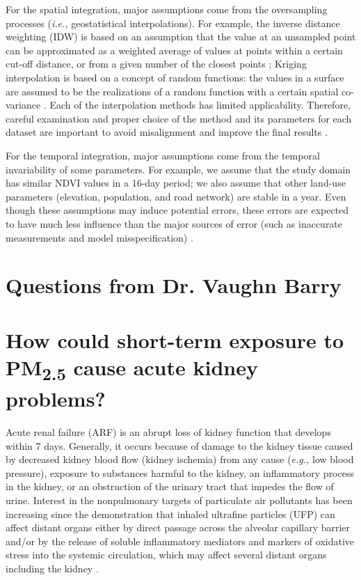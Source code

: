 \documentclass[11pt]{article}
\newcommand{\tsub}{\textsubscript}
\begin{document}
\begin{enumerate*}[{[a)]}]
{    \item For the spatial integration, major assumptions come from the oversampling processes (\textit{i.e.,} geostatistical interpolations). For example, the inverse distance weighting (IDW) is based on an assumption that the value at an unsampled point can be approximated as a weighted average of values at points within a certain cut-off distance, or from a given number of the closest points \citep{bartier1996multivariate}; Kriging interpolation is based on a concept of random functions: the values in a surface are assumed to be the realizations of a random function with a certain spatial co-variance \citep{oliver1990kriging}. Each of the interpolation methods has limited applicability. Therefore, careful examination and proper choice of the method and its parameters for each dataset are important to avoid misalignment and improve the final results \citep{mitas1999spatial}.
    
    For the temporal integration, major assumptions come from the temporal invariability of some parameters. For example, we assume that the study domain has similar NDVI values in a 16-day period; we also assume that other land-use parameters (elevation, population, and road network) are stable in a year. Even though these assumptions may induce potential errors, these errors are expected to have much less influence than the major sources of error (such as inaccurate measurements and model misspecification) \citep{xiao2017full}.
    }
\end{enumerate*}



\hdashrule{\textwidth}{0.1pt}{3mm 3pt 1mm 3pt}
\setcounter{section}{0}

\section*{Questions from Dr. Vaughn Barry}

\section{How could short-term exposure to \texorpdfstring{PM\tsub{2.5}}{PM2.5} cause acute kidney problems?}
Acute renal failure (ARF) is an abrupt loss of kidney function that develops within 7 days. Generally, it occurs because of damage to the kidney tissue caused by decreased kidney blood flow (kidney ischemia) from any cause (\textit{e.g.,} low blood pressure), exposure to substances harmful to the kidney, an inflammatory process in the kidney, or an obstruction of the urinary tract that impedes the flow of urine. Interest in the nonpulmonary targets of particulate air pollutants has been increasing since the demonstration that inhaled ultrafine particles (UFP) can affect distant organs either by direct passage across the alveolar capillary barrier and/or by the release of soluble inflammatory mediators and markers of oxidative stress into the systemic circulation, which may affect several distant organs including the kidney \citep{nemmar2004possible, oberdorster2005nanotoxicology, peters2006translocation, vermylen2005ambient, nemmar2013recent}. 
\end{document}
